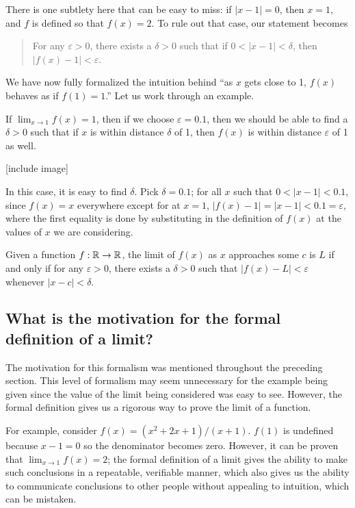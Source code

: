 There is one subtlety here that can be easy to miss: if $|x - 1| = 0$, then $x = 1$, and $f$ is defined so that $f(x) = 2$. To rule out that case, our statement becomes

\begin{quotation}
For any $\varepsilon > 0$, there exists a $\delta > 0$ such that if $0 < |x - 1| < \delta$, then $|f(x) - 1| < \varepsilon$.
\end{quotation}

We have now fully formalized the intuition behind ``as $x$ gets close to 1, $f(x)$ behaves as if $f(1) = 1$.'' Let us work through an example.

If $\lim_{x \to 1} f(x) = 1$, then if we choose $\varepsilon = 0.1$, then we should be able to find a $\delta > 0$ such that if $x$ is within distance $\delta$ of 1, then $f(x)$ is within distance $\varepsilon$ of 1 as well.

[include image]

In this case, it is easy to find $\delta$. Pick $\delta = 0.1$; for all $x$ such that $0 < |x - 1| < 0.1$, since $f(x) = x$ everywhere except for at $x = 1$, $|f(x) - 1| = |x - 1| < 0.1 = \varepsilon$, where the first equality is done by substituting in the definition of $f(x)$ at the values of $x$ we are considering.

\begin{defn}
Given a function $f : \mathbb{R} \to \mathbb{R}$, the limit of $f(x)$ as $x$ approaches some $c$ is $L$ if and only if for any $\varepsilon > 0$, there exists a $\delta > 0$ such that $|f(x) - L| < \varepsilon$ whenever $|x - c| < \delta$.
\end{defn}

\subsection{What is the motivation for the formal definition of a limit?}
The motivation for this formalism was mentioned throughout the preceding section. This level of formalism may seem unnecessary for the example being given since the value of the limit being considered was easy to see. However, the formal definition gives us a rigorous way to prove the limit of a function.

For example, consider $f(x) = (x^2 + 2x + 1)/(x + 1)$. $f(1)$ is undefined because $x - 1 = 0$ so the denominator becomes zero. However, it can be proven that $\lim_{x \to 1} f(x) = 2$; the formal definition of a limit gives the ability to make such conclusions in a repeatable, verifiable manner, which also gives us the ability to communicate conclusions to other people without appealing to intuition, which can be mistaken.

